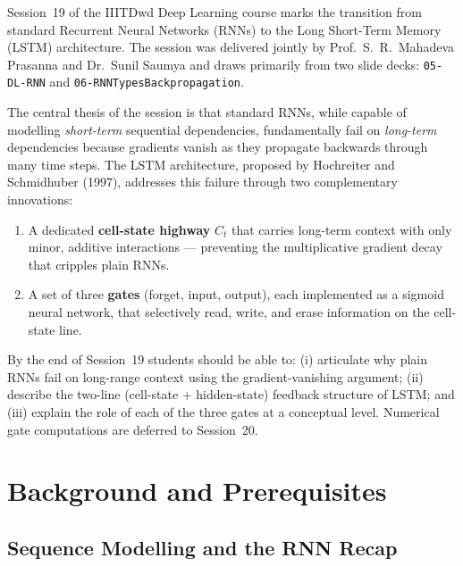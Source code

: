 \documentclass[12pt,a4paper]{article}
\begin{document}
Session~19 of the IIITDwd Deep Learning course marks the transition from
standard Recurrent Neural Networks (RNNs) to the Long Short-Term Memory
(LSTM) architecture. The session was delivered jointly by
Prof.\ S.\ R.\ Mahadeva Prasanna and Dr.\ Sunil Saumya and draws primarily
from two slide decks: \texttt{05-DL-RNN} and
\texttt{06-RNNTypesBackpropagation}.

The central thesis of the session is that standard RNNs, while capable of
modelling \emph{short-term} sequential dependencies, fundamentally fail on
\emph{long-term} dependencies because gradients vanish as they propagate
backwards through many time steps. The LSTM architecture, proposed by
Hochreiter and Schmidhuber (1997), addresses this failure through two
complementary innovations:

\begin{enumerate}[label=\textbf{\arabic*.}]
  \item A dedicated \textbf{cell-state highway} $C_t$ that carries long-term
        context with only minor, additive interactions --- preventing the
        multiplicative gradient decay that cripples plain RNNs.
  \item A set of three \textbf{gates} (forget, input, output), each
        implemented as a sigmoid neural network, that selectively read,
        write, and erase information on the cell-state line.
\end{enumerate}

\begin{keyinsight}[title=Session Objective]
By the end of Session~19 students should be able to: (i) articulate why
plain RNNs fail on long-range context using the gradient-vanishing argument;
(ii) describe the two-line (cell-state + hidden-state) feedback structure of
LSTM; and (iii) explain the role of each of the three gates at a conceptual
level. Numerical gate computations are deferred to Session~20.
\end{keyinsight}

\section{Background and Prerequisites}
\label{sec:background}

\subsection{Sequence Modelling and the RNN Recap}
\label{subsec:rnn-recap}
\end{document}
